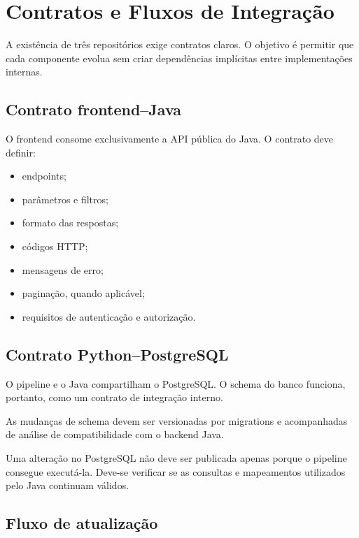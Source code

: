 \section{Contratos e Fluxos de Integração}

A existência de três repositórios exige contratos claros. O objetivo é permitir que cada componente evolua sem criar dependências implícitas entre implementações internas.

\subsection{Contrato frontend--Java}

O frontend consome exclusivamente a API pública do Java. O contrato deve definir:

\begin{itemize}
    \item endpoints;
    \item parâmetros e filtros;
    \item formato das respostas;
    \item códigos HTTP;
    \item mensagens de erro;
    \item paginação, quando aplicável;
    \item requisitos de autenticação e autorização.
\end{itemize}

\subsection{Contrato Python--PostgreSQL}

O pipeline e o Java compartilham o PostgreSQL. O schema do banco funciona, portanto, como um contrato de integração interno.

As mudanças de schema devem ser versionadas por migrations e acompanhadas de análise de compatibilidade com o backend Java.

\begin{regra}
Uma alteração no PostgreSQL não deve ser publicada apenas porque o pipeline consegue executá-la. Deve-se verificar se as consultas e mapeamentos utilizados pelo Java continuam válidos.
\end{regra}

\subsection{Fluxo de atualização}

